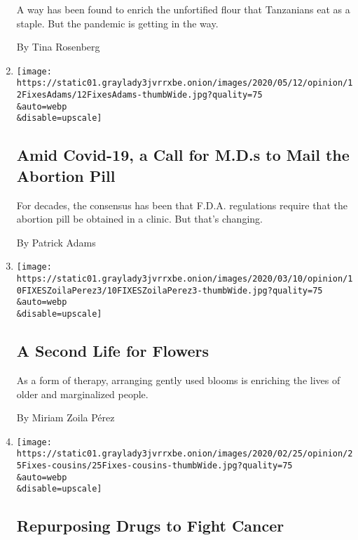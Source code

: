 \begin{enumerate}
  A way has been found to enrich the unfortified flour that Tanzanians
  eat as a staple. But the pandemic is getting in the way.

  By Tina Rosenberg
\item
  \href{/2020/05/12/opinion/covid-abortion-pill.html}{}

  \texttt{[image: https://static01.graylady3jvrrxbe.onion/images/2020/05/12/opinion/12FixesAdams/12FixesAdams-thumbWide.jpg?quality=75\\\&auto=webp\\\&disable=upscale]}

  \hypertarget{amid-covid-19-a-call-for-mds-to-mail-the-abortion-pill}{%
  \subsection{Amid Covid-19, a Call for M.D.s to Mail the Abortion
  Pill}\label{amid-covid-19-a-call-for-mds-to-mail-the-abortion-pill}}

  For decades, the consensus has been that F.D.A. regulations require
  that the abortion pill be obtained in a clinic. But that's changing.

  By Patrick Adams
\item
  \href{/2020/03/10/opinion/second-life-flowers.html}{}

  \texttt{[image: https://static01.graylady3jvrrxbe.onion/images/2020/03/10/opinion/10FIXESZoilaPerez3/10FIXESZoilaPerez3-thumbWide.jpg?quality=75\\\&auto=webp\\\&disable=upscale]}

  \hypertarget{a-second-life-for-flowers}{%
  \subsection{A Second Life for
  Flowers}\label{a-second-life-for-flowers}}

  As a form of therapy, arranging gently used blooms is enriching the
  lives of older and marginalized people.

  By Miriam Zoila Pérez
\item
  \href{/2020/02/25/opinion/repurposing-drugs-cancer.html}{}

  \texttt{[image: https://static01.graylady3jvrrxbe.onion/images/2020/02/25/opinion/25Fixes-cousins/25Fixes-cousins-thumbWide.jpg?quality=75\\\&auto=webp\\\&disable=upscale]}

  \hypertarget{repurposing-drugs-to-fight-cancer}{%
  \subsection{Repurposing Drugs to Fight
  Cancer}\label{repurposing-drugs-to-fight-cancer}}


\end{enumerate}
